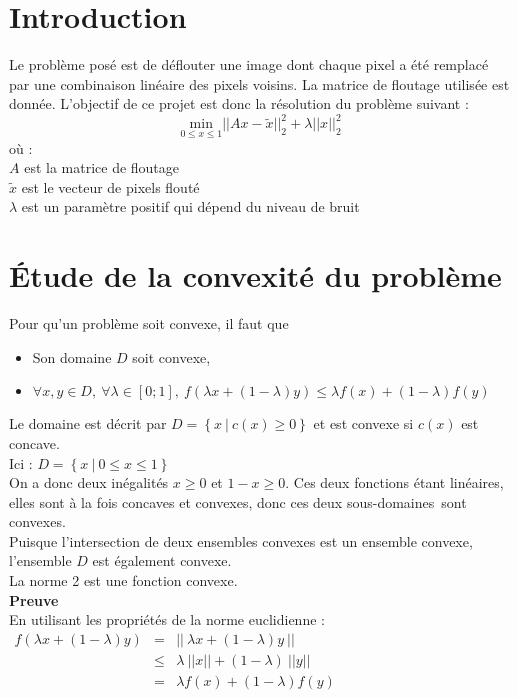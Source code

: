 \documentclass[12pt, a4paper]{report}
\begin{document}
\umonsCoverPage
\tableofcontents
\clearpage
\section{Introduction}
Le problème posé est de déflouter une image dont chaque pixel a été remplacé par une combinaison linéaire des pixels voisins. La matrice de floutage utilisée est donnée. L'objectif de ce projet est donc la résolution du problème suivant :\\
\[\underset{0 \leq x \leq 1}{\mathrm{min}} ||Ax - \tilde{x}||_2^2 + \lambda||x||_2^2\]
où :\\
$A$ est la matrice de floutage\\
$\tilde{x}$ est le vecteur de pixels flouté\\
$\lambda$ est un paramètre positif qui dépend du niveau de bruit\\

\section{Étude de la convexité du problème}
\noindent
Pour qu'un problème soit convexe, il faut que
\begin{itemize}
\item Son domaine $ D $ soit convexe,
\item $\forall x,y \in D,\ \forall \lambda \in \left[0;1\right],\ f(\lambda x + (1 - \lambda)y) \leq \lambda f(x) + (1-\lambda)f(y)$
\end{itemize}
\noindent
\linebreak
Le domaine est décrit par \( D = \left\{ x\ |\ c(x) \geq 0 \right\} \) et est convexe si $c(x)$ est concave.\\
Ici : \( D = \left\{ x\ |\ 0 \leq x \leq 1 \right\}\)\\
On a donc deux inégalités $x \geq 0$ et $1 - x \geq 0$. Ces deux fonctions étant linéaires, elles sont à la fois concaves et convexes, donc ces deux \og sous-domaines\fg\ sont convexes.\\
Puisque l'intersection de deux ensembles convexes est un ensemble convexe, l'ensemble $D$ est également convexe.\\

\noindent
La norme 2 est une fonction convexe.\\

\noindent
\textbf{Preuve}\\
En utilisant les propriétés de la norme euclidienne :\\
$\begin{array}{rcl}
f(\lambda x + (1-\lambda)y) & = & ||\ \lambda x + (1-\lambda)y\ ||\\
 & \leq & \lambda\ ||x|| + (1-\lambda)\ ||y||\\
 & = & \lambda f(x) + (1-\lambda)f(y)\\
\end{array}$
\end{document}
